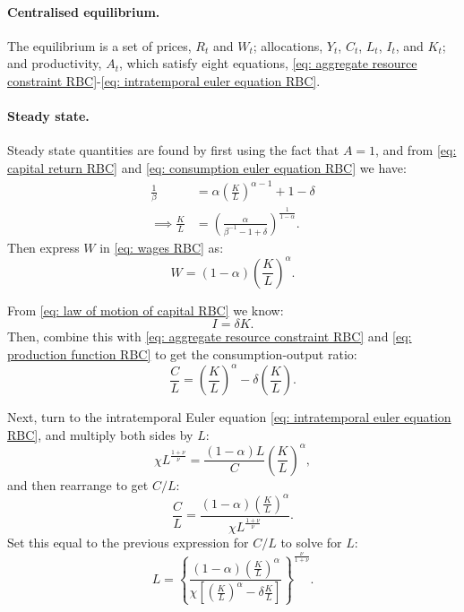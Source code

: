 \documentclass[12pt,english]{extarticle}
\begin{document}
	\paragraph{Centralised equilibrium.} The equilibrium is a set of prices, $R_t$ and $W_t$; allocations, $Y_t$, $C_t$, $L_t$, $I_t$, and $K_t$; and productivity, $A_t$, which satisfy eight equations, \eqref{eq: aggregate resource constraint RBC}-\eqref{eq: intratemporal euler equation RBC}.
	
	\paragraph{Steady state.} Steady state quantities are found by first using the fact that $A=1$, and from \eqref{eq: capital return RBC} and \eqref{eq: consumption euler equation RBC} we have:
	\begin{equation*}
		\begin{split}
			\frac{1}{\beta} &= \alpha\left(\frac{K}{L}\right)^{\alpha-1} + 1 - \delta \\
			\implies \frac{K}{L} &= \left(\frac{\alpha}{\beta^{-1}-1+\delta}\right)^{\frac{1}{1-\alpha}}.
		\end{split}
	\end{equation*}
	Then express $W$ in \eqref{eq: wages RBC} as:
	\begin{equation*}
		W = (1-\alpha)\left(\frac{K}{L}\right)^\alpha.
	\end{equation*}
	
	From \eqref{eq: law of motion of capital RBC} we know:
	\begin{equation*}
		I = \delta K.
	\end{equation*}
	Then, combine this with \eqref{eq: aggregate resource constraint RBC} and \eqref{eq: production function RBC} to get the consumption-output ratio:
	\begin{equation*}
		\frac{C}{L} = \left(\frac{K}{L}\right)^\alpha - \delta\left(\frac{K}{L}\right).
	\end{equation*}
	
	Next, turn to the intratemporal Euler equation \eqref{eq: intratemporal euler equation RBC}, and multiply both sides by $L$:
	\begin{equation*}
		\chi L^{\frac{1+\nu}{\nu}} = \frac{(1-\alpha)L}{C}\left(\frac{K}{L}\right)^\alpha,
	\end{equation*}
	and then rearrange to get $C/L$:
	\begin{equation*}
		\frac{C}{L} = \frac{(1-\alpha)\left(\frac{K}{L}\right)^\alpha}{\chi L^{\frac{1+\nu}{\nu}}}.
	\end{equation*}
	Set this equal to the previous expression for $C/L$ to solve for $L$:
	\begin{equation*}
		L = \left\{\frac{(1-\alpha)\left(\frac{K}{L}\right)^\alpha}{\chi\left[\left(\frac{K}{L}\right)^\alpha - \delta\frac{K}{L}\right]}\right\}^{\frac{\nu}{1+\nu}}.
	\end{equation*}
	
\end{document}
